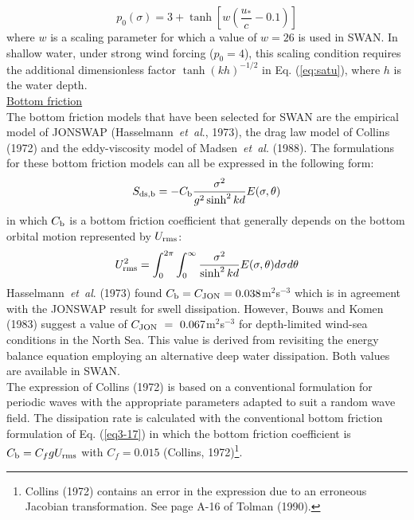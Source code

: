 \documentclass[12pt]{book}
\begin{document}
\begin{equation}
  p_0(\sigma) = 3 + \tanh \left[ w \left( \frac{u_*}{c} - 0.1 \right) \right]
\end{equation}
where $w$ is a scaling parameter for which a value of $w = 26$ is used in SWAN. In shallow water, under strong wind forcing ($p_0=4$), this
scaling condition requires the additional dimensionless factor ${\tanh(kh)}^{-1/2}$ in Eq. (\ref{eq:satu}), where $h$ is the water depth.
\nocite{Res04LV}
\\[2ex]
\noindent
\underline{Bottom friction}\\[2ex]
The bottom friction models that have been selected for SWAN are the empirical model of JONSWAP
(Hasselmann~{\it et~al}., 1973), the drag law model of Collins (1972) and the eddy-viscosity model of
Madsen~{\it et~al}. (1988). The formulations for these bottom friction models can all be expressed in the following form:
\begin{equation}
  S_{\rm ds,b} = -C_{\rm b} \frac{\sigma^2}{g^2 \sinh^2 kd} E (\sigma,\theta)
  \label{eq3-17}
\end{equation}
in which $C_{\rm b}$ is a bottom friction coefficient that generally depends on the bottom orbital motion
represented by $U_{\rm rms}$:
\begin{equation}
  U^2_{\rm rms} = \int_{0}^{2\pi} \int_{0}^{\infty} \frac{\sigma^2}{\sinh^2 kd} E(\sigma,\theta) d\sigma d\theta
  \label{eq3-18}
\end{equation}
Hasselmann~{\it et~al}. (1973) found $C_{\rm b}=C_{\rm JON}=0.038$m$^{2}$s$^{-3}$ which is in
agreement with the JONSWAP result for swell dissipation. However, Bouws and Komen (1983) suggest a
value of $C_{\rm JON}~=~0.067$m$^{2}$s$^{-3}$ for depth-limited wind-sea conditions in the North Sea. This value is derived
from revisiting the energy balance equation employing an alternative deep water dissipation.
Both values are available in SWAN.
\\[2ex]
\noindent
The expression of Collins (1972) is based on a conventional formulation for periodic waves with the
appropriate parameters adapted to suit a random wave field. The dissipation rate is calculated with the
conventional bottom friction formulation of Eq. (\ref{eq3-17}) in which the bottom friction coefficient is
$C_{\rm b} = C_f g U_{\rm rms}$ with $C_f = 0.015$ (Collins, 1972)\footnote{Collins (1972) contains
an error in the expression due to an erroneous Jacobian transformation. See page A-16 of Tolman (1990).}.
\\[2ex]
\noindent
\end{document}
